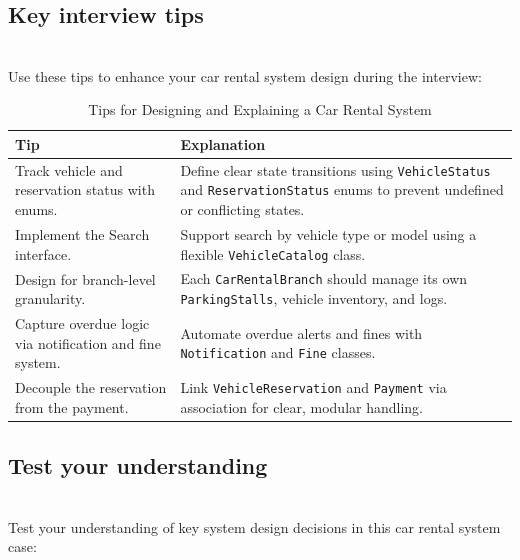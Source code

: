 \subsection{Key interview tips}\label{O1iw2NFUDJ9Qo3fuQGh2F}
\\
Use these tips to enhance your car rental system design during the interview:
\begin{table}[h!]
\centering
\begin{tabular}{|p{6cm}|p{9cm}|}
\hline
\textbf{Tip} & \textbf{Explanation} \\
\hline
Track vehicle and reservation status with enums. & Define clear state transitions using \texttt{VehicleStatus} and \texttt{ReservationStatus} enums to prevent undefined or conflicting states. \\
\hline
Implement the Search interface. & Support search by vehicle type or model using a flexible \texttt{VehicleCatalog} class. \\
\hline
Design for branch-level granularity. & Each \texttt{CarRentalBranch} should manage its own \texttt{ParkingStalls}, vehicle inventory, and logs. \\
\hline
Capture overdue logic via notification and fine system. & Automate overdue alerts and fines with \texttt{Notification} and \texttt{Fine} classes. \\
\hline
Decouple the reservation from the payment. & Link \texttt{VehicleReservation} and \texttt{Payment} via association for clear, modular handling. \\
\hline
\end{tabular}
\caption{Tips for Designing and Explaining a Car Rental System}
\label{tab:car_rental_tips}
\end{table}

\subsection{Test your understanding}\label{wFRjC0vcOD0of7Mcf3-No}
\\
Test your understanding of key system design decisions in this car rental system case:

